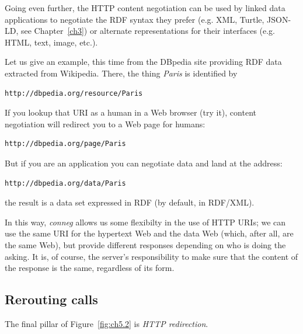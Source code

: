 Going even further, the HTTP content negotiation can be used by linked
data applications to negotiate the RDF syntax they prefer (e.g. XML,
Turtle, JSON-LD, see Chapter~\ref{ch3}) or alternate representations for their interfaces (e.g.
HTML, text, image, etc.).

Let us give an example, this time from the DBpedia site providing RDF
data extracted from Wikipedia. There, the thing \emph{Paris} is identified
by

\begin{lstlisting}
http://dbpedia.org/resource/Paris
\end{lstlisting}

If you lookup that URI as a human in a Web browser (try it), content
negotiation will redirect you to a Web page for humans:

\begin{lstlisting}
http://dbpedia.org/page/Paris
\end{lstlisting}

But if you are an application you can negotiate data and land at the
address:

\begin{lstlisting}
http://dbpedia.org/data/Paris
\end{lstlisting}

the result is a data set expressed in RDF (by default, in RDF/XML).  

In this way, \emph{conneg} allows us some flexibilty in the use of HTTP URIs;  we can use 
the same URI for the hypertext Web and the data Web (which, after all, are the same Web), but
provide different responses depending on who is doing the asking.  It is, of course, the server's responsibility to make sure that the content of the response is the same, regardless of its form. 


\hypertarget{rerouting-calls}{%
\subsection{Rerouting calls}\label{rerouting-calls}}

The final pillar of Figure~\ref{fig:ch5.2} is  \emph{HTTP redirection}.

